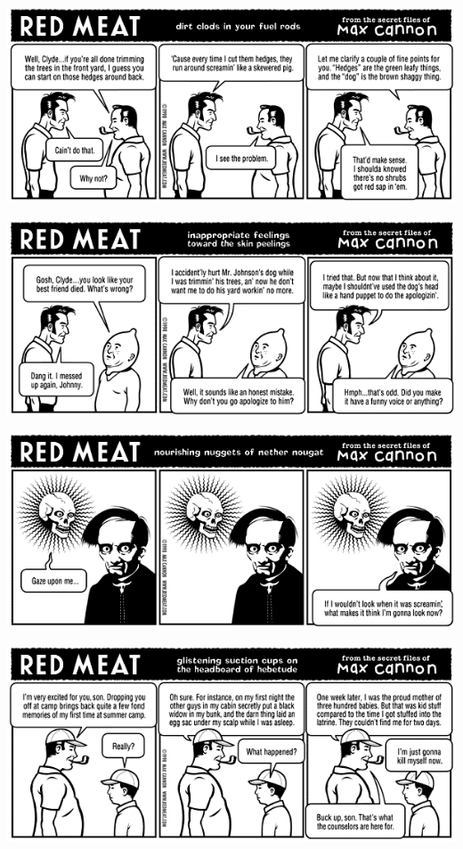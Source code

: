 \documentclass[a4paper,twoside,11pt]{article}
\begin{document}
\includegraphics[width=\textwidth]{redmeat_1998-10-26.png}



\includegraphics[width=\textwidth]{redmeat_1998-11-02.png}



\includegraphics[width=\textwidth]{redmeat_1998-11-09.png}



\includegraphics[width=\textwidth]{redmeat_1998-11-16.png}
\end{document}
